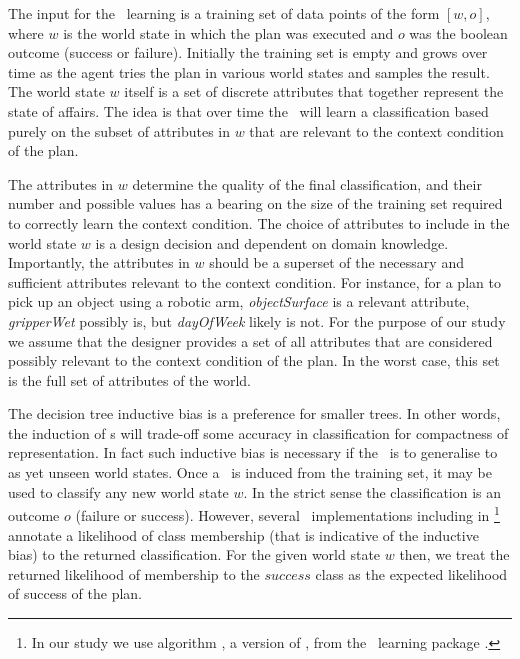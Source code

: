 The input for the \dt\ learning is a training set of data points of the form $[w,o]$, where $w$ is the world state in which the plan was executed and $o$ was the boolean outcome (success or failure). Initially the training set is empty and grows over time as the agent tries the plan in various world states and samples the result. The world state $w$ itself is a set of discrete attributes that together represent the state of affairs. The idea is that over time the \dt\ will learn a classification based purely on the subset of attributes in $w$ that are relevant to the context condition of the plan. 

The attributes in $w$ determine the quality of the final classification, and their number and possible values has a bearing on the size of the training set required to correctly learn the context condition. The choice of attributes to include in the world state $w$ is a design decision and dependent on domain knowledge. Importantly, the attributes in $w$ should be a superset of the necessary and sufficient attributes relevant to the context condition. For instance, for a plan to pick up an object using a robotic arm, \textit{objectSurface} is a relevant attribute, \textit{gripperWet} possibly is, but \textit{dayOfWeek} likely is not. For the purpose of our study we assume that the designer provides a set of all attributes that are considered possibly relevant to the context condition of the plan. In the worst case, this set is the full set of attributes of the world. 

The decision tree inductive bias is a preference for smaller trees. In other words, the induction of \dt s will trade-off some accuracy in classification for compactness of representation. In fact such inductive bias is necessary if the \dt\ is to generalise to as yet unseen world states. Once a \dt\ is induced from the training set, it may be used to classify any new world state $w$. In the strict sense the classification is an outcome $o$ (failure or success). However, several \dt\ implementations including  in \weka\footnote{In our study we use algorithm , a version of  \cite{Mitchell97:ML}, from the \weka\ learning package \cite{weka99}.} annotate a likelihood of class membership (that is indicative of the inductive bias) to the returned classification. For the given world state $w$ then, we treat the returned likelihood of membership to the $success$ class as the expected likelihood of success of the plan.


